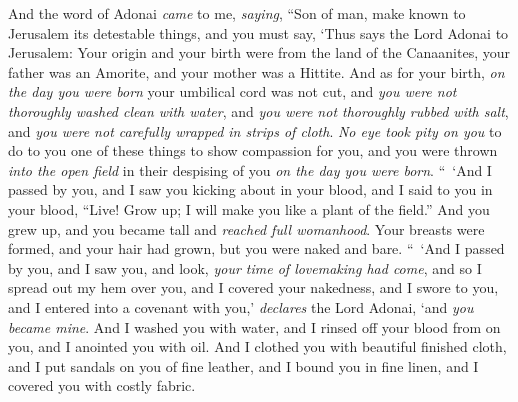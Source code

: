 \begin{biblechapter} %
 And the word of Adonai \textit{came} to me, \textit{saying},
\verse “Son of man, make known to Jerusalem its detestable things,
\verse and you must say, ‘Thus says the Lord Adonai to Jerusalem: Your origin and your birth were from the land of the Canaanites, your father was an Amorite, and your mother was a Hittite.
\verse And as for your birth, \textit{on the day you were born} your umbilical cord was not cut, and \textit{you were not thoroughly washed clean with water}, and \textit{you were not thoroughly rubbed with salt}, and \textit{you were not carefully wrapped in strips of cloth}.
\verse \textit{No eye took pity on you} to do to you one of these things to show compassion for you, and you were thrown \textit{into the open field} in their despising of you \textit{on the day you were born}.
\verse “ ‘And I passed by you, and I saw you kicking about in your blood, and I said to you in your blood, “Live!
\verse Grow up; I will make you like a plant of the field.” And you grew up, and you became tall and \textit{reached full womanhood}. Your breasts were formed, and your hair had grown, but you were naked and bare.
\verse “ ‘And I passed by you, and I saw you, and look, \textit{your time of lovemaking had come}, and so I spread out my hem over you, and I covered your nakedness, and I swore to you, and I entered into a covenant with you,’ \textit{declares} the Lord Adonai, ‘and \textit{you became mine}.
\verse And I washed you with water, and I rinsed off your blood from on you, and I anointed you with oil.
\verse And I clothed you with beautiful finished cloth, and I put sandals on you of fine leather, and I bound you in fine linen, and I covered you with costly fabric.

\end{biblechapter}
